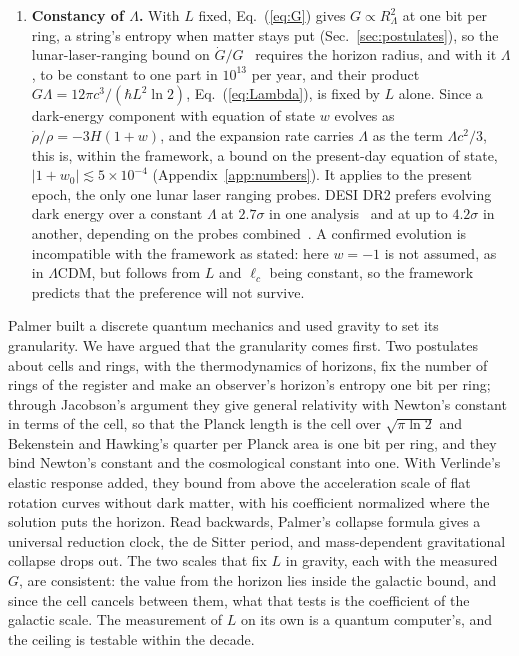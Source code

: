 \documentclass[aps,prd,twocolumn,superscriptaddress,nofootinbib,showkeys]{revtex4-2}
\makeatletter
\newcommand{\lc}{\ell_c}
\newcommand{\RL}{R_\Lambda}
\def\section{\@startsection{section}{1}{\z@}{0.6cm \@plus1ex \@minus .2ex}{0.35cm}{\normalfont\small\bfseries}}
\makeatother
\begin{document}
\begin{enumerate}
\item {\boldmath\textbf{Constancy of $\Lambda$.}} With $L$ fixed, Eq.~(\ref{eq:G}) gives $G\propto\RL^2$ at one bit per ring, a string's entropy when matter stays put (Sec.~\ref{sec:postulates}), so the lunar-laser-ranging bound on $\dot G/G$~\cite{hofmann2018} requires the horizon radius, and with it $\Lambda$, to be constant to one part in $10^{13}$ per year, and their product $G\Lambda = 12\pi c^3/(\hbar L^2\ln2)$, Eq.~(\ref{eq:Lambda}), is fixed by $L$ alone. Since a dark-energy component with equation of state $w$ evolves as $\dot\rho/\rho = -3H(1+w)$, and the expansion rate carries $\Lambda$ as the term $\Lambda c^2/3$, this is, within the framework, a bound on the present-day equation of state, $|1+w_0| \lesssim 5\times10^{-4}$ (Appendix~\ref{app:numbers}). It applies to the present epoch, the only one lunar laser ranging probes. DESI DR2 prefers evolving dark energy over a constant $\Lambda$ at $2.7\sigma$ in one analysis~\cite{desi2026} and at up to $4.2\sigma$ in another, depending on the probes combined~\cite{desi2025}. A confirmed evolution is incompatible with the framework as stated: here $w=-1$ is not assumed, as in $\Lambda$CDM, but follows from $L$ and $\lc$ being constant, so the framework predicts that the preference will not survive.
\end{enumerate}

\section{Conclusion}

Palmer built a discrete quantum mechanics and used gravity to set its granularity. We have argued that the granularity comes first. Two postulates about cells and rings, with the thermodynamics of horizons, fix the number of rings of the register and make an observer's horizon's entropy one bit per ring; through Jacobson's argument they give general relativity with Newton's constant in terms of the cell, so that the Planck length is the cell over $\sqrt{\pi\ln2}$ and Bekenstein and Hawking's quarter per Planck area is one bit per ring, and they bind Newton's constant and the cosmological constant into one. With Verlinde's elastic response added, they bound from above the acceleration scale of flat rotation curves without dark matter, with his coefficient normalized where the solution puts the horizon. Read backwards, Palmer's collapse formula gives a universal reduction clock, the de Sitter period, and mass-dependent gravitational collapse drops out. The two scales that fix $L$ in gravity, each with the measured $G$, are consistent: the value from the horizon lies inside the galactic bound, and since the cell cancels between them, what that tests is the coefficient of the galactic scale. The measurement of $L$ on its own is a quantum computer's, and the ceiling is testable within the decade.
\end{document}
